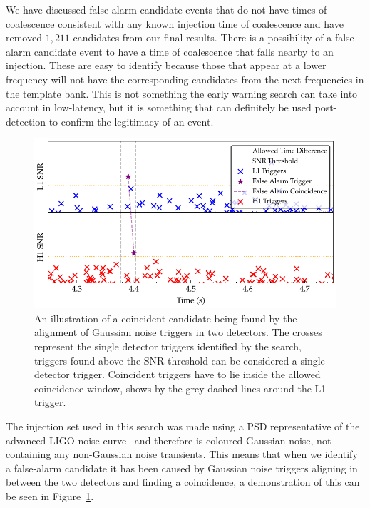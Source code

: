 We have discussed false alarm candidate events that do not have times of coalescence consistent with any known injection time of coalescence and have removed $1,211$ candidates from our final results. There is a possibility of a false alarm candidate event to have a time of coalescence that falls nearby to an injection. These are easy to identify because those that appear at a lower frequency will not have the corresponding candidates from the next frequencies in the template bank. This is not something the early warning search can take into account in low-latency, but it is something that can definitely be used post-detection to confirm the legitimacy of an event.
%
\begin{figure}
       \centering
    \includegraphics[width=\textwidth]{images/6_earlywarning/identified-problems/low_sig_cands.pdf}
    \caption{An illustration of a coincident candidate being found by the alignment of Gaussian noise triggers in two detectors. The crosses represent the single detector triggers identified by the \gwadj search, triggers found above the SNR threshold can be considered a single detector trigger. Coincident triggers have to lie inside the allowed coincidence window, shows by the grey dashed lines around the L1 trigger.}
    \label{6:fig:low_significance_candidates}
\end{figure}
%
The injection set used in this search was made using a PSD representative of the advanced LIGO noise curve~\cite{aLIGO_design_curve:2018} and therefore is coloured Gaussian noise, not containing any non-Gaussian noise transients. This means that when we identify a false-alarm candidate it has been caused by Gaussian noise triggers aligning in between the two detectors and finding a coincidence, a demonstration of this can be seen in Figure~\ref{6:fig:low_significance_candidates}.

